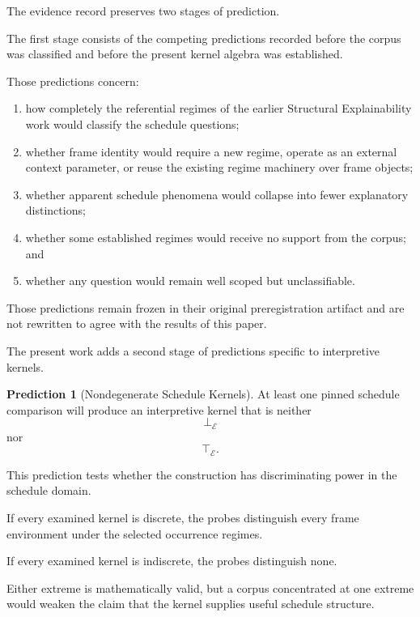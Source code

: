 \documentclass[11pt]{article}
\theoremstyle{plain}
\theoremstyle{definition}
\newtheorem{prediction}[theorem]{Prediction}
\theoremstyle{remark}
\begin{document}
The evidence record preserves
two stages of prediction.

The first stage consists
of the competing predictions
recorded before the corpus was classified
and before the present kernel algebra
was established.

Those predictions concern:

\begin{enumerate}[label=(\alph*)]
  \item how completely
        the referential regimes
        of the earlier Structural Explainability work
        would classify the schedule questions;
  \item whether frame identity
        would require a new regime,
        operate as an external context parameter,
        or reuse the existing regime machinery
        over frame objects;
  \item whether apparent schedule phenomena
        would collapse into fewer explanatory distinctions;
  \item whether some established regimes
        would receive no support from the corpus; and
  \item whether any question
        would remain well scoped
        but unclassifiable.
\end{enumerate}

Those predictions remain frozen
in their original preregistration artifact and
are not rewritten to agree with the results of this paper.

The present work adds
a second stage of predictions
specific to interpretive kernels.

\begin{prediction}[Nondegenerate Schedule Kernels]
  \label{ik.prediction.nondegenerate}
  At least one pinned schedule comparison
  will produce an interpretive kernel
  that is neither
  \[
    \bot_{\mathcal{E}}
  \]
  nor
  \[
    \top_{\mathcal{E}}.
  \]
\end{prediction}

This prediction tests whether
the construction has discriminating power
in the schedule domain.

If every examined kernel is discrete,
the probes distinguish every frame environment
under the selected occurrence regimes.

If every examined kernel is indiscrete,
the probes distinguish none.

Either extreme is mathematically valid,
but a corpus concentrated at one extreme
would weaken the claim
that the kernel supplies useful schedule structure.
\end{document}
